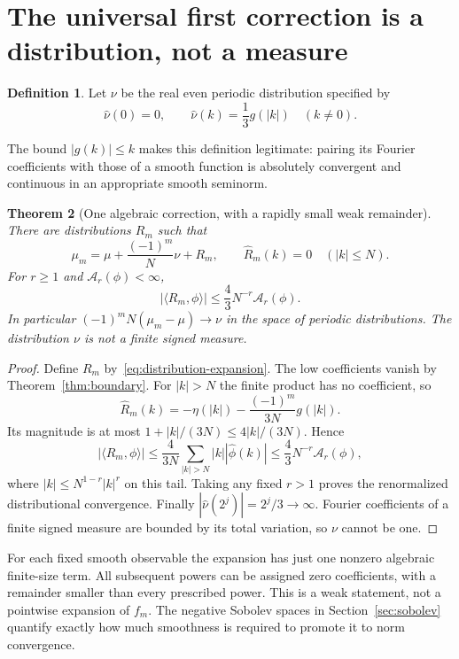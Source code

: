 \documentclass[11pt,a4paper]{article}
\numberwithin{equation}{section}
\newtheorem{theorem}{Theorem}[section]
\theoremstyle{definition}
\newtheorem{definition}[theorem]{Definition}
\theoremstyle{remark}
\newcommand{\pair}[2]{\langle #1,#2\rangle}
\newcommand{\abs}[1]{\lvert #1\rvert}
\newcommand{\Ast}{\mathcal A}
\begin{document}
\section{The universal first correction is a distribution, not a measure}
\label{sec:distribution}

\begin{definition}
Let $\nu$ be the real even periodic distribution specified by
\begin{equation}
 \widehat\nu(0)=0,\qquad
 \widehat\nu(k)=\frac13g(|k|)\quad(k\ne0).
 \label{eq:nu}
\end{equation}
\end{definition}
The bound $|g(k)|\le k$ makes this definition legitimate: pairing its Fourier
coefficients with those of a smooth function is absolutely convergent and
continuous in an appropriate smooth seminorm.

\begin{theorem}[One algebraic correction, with a rapidly small weak remainder]
\label{thm:distribution}
There are distributions $R_m$ such that
\begin{equation}
 \mu_m=\mu+\frac{(-1)^m}{N}\nu+R_m,
 \qquad \widehat R_m(k)=0\quad(|k|\le N).
 \label{eq:distribution-expansion}
\end{equation}
For $r\ge1$ and $\Ast_r(\phi)<\infty$,
\begin{equation}
 \abs{\pair{R_m}{\phi}}\le\frac43N^{-r}\Ast_r(\phi).
 \label{eq:R-bound}
\end{equation}
In particular $(-1)^mN(\mu_m-\mu)\to\nu$ in the space of periodic distributions.
The distribution $\nu$ is not a finite signed measure.
\end{theorem}
\begin{proof}
Define $R_m$ by~\eqref{eq:distribution-expansion}. The low coefficients vanish
by Theorem~\ref{thm:boundary}. For $|k|>N$ the finite product has no coefficient,
so
\[
 \widehat R_m(k)=-\eta(|k|)-\frac{(-1)^m}{3N}g(|k|).
\]
Its magnitude is at most $1+|k|/(3N)\le4|k|/(3N)$. Hence
\[
 |\pair{R_m}{\phi}|
 \le\frac4{3N}\sum_{|k|>N}|k||\widehat\phi(k)|
 \le\frac43N^{-r}\Ast_r(\phi),
\]
where $|k|\le N^{1-r}|k|^r$ on this tail. Taking any fixed $r>1$ proves the
renormalized distributional convergence. Finally
$|\widehat\nu(2^j)|=2^j/3\to\infty$. Fourier coefficients of a finite signed
measure are bounded by its total variation, so $\nu$ cannot be one.
\end{proof}

For each fixed smooth observable the expansion has just one nonzero algebraic
finite-size term. All subsequent powers can be assigned zero coefficients, with
a remainder smaller than every prescribed power. This is a weak statement, not
a pointwise expansion of $f_m$. The negative Sobolev spaces in
Section~\ref{sec:sobolev} quantify exactly how much smoothness is required to
promote it to norm convergence.
\end{document}
